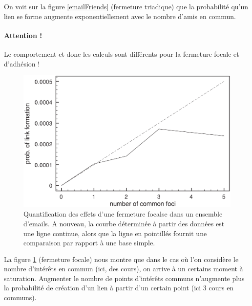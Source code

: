 On voit sur la figure \ref{emailFriends} (fermeture triadique) que la probabilité qu'un lien se forme augmente exponentiellement avec le nombre d'amis en commun.

\paragraph{Attention !}
Le comportement et donc les calculs sont différents pour la fermeture focale et d'adhésion !

\begin{figure}[!ht]
    \centering
    \includegraphics[width=\textwidth]{images/21_pointsCommuns.png}
    \caption{Quantification des effets d'une fermeture focalse dans un
        ensemble d'emails. A nouveau, la courbe déterminée à partir des
        données est une ligne continue, alors que la ligne en pointillés
    fournit une comparaison par rapport à une base simple.}
    \label{pointsCommuns}
\end{figure}

La figure \ref{pointsCommuns} (fermeture focale) nous montre que dans le cas où l'on considère le nombre d'intérêts en commun (ici, des cours), on arrive à un certains moment à saturation. Augmenter le nombre de points d'intérêts communs n'augmente plus la probabilité de création d'un lien à partir d'un certain point (ici 3 cours en communs).

